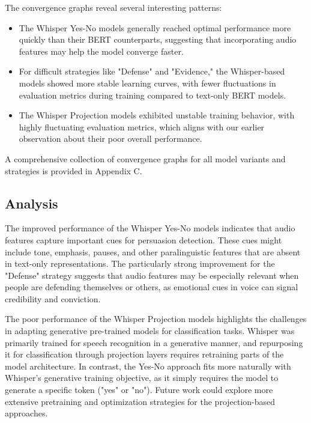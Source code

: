 \documentclass{article}
\begin{document}
The convergence graphs reveal several interesting patterns:

\begin{itemize}
    \item The Whisper Yes-No models generally reached optimal performance more quickly than their BERT counterparts, suggesting that incorporating audio features may help the model converge faster.
    
    \item For difficult strategies like "Defense" and "Evidence," the Whisper-based models showed more stable learning curves, with fewer fluctuations in evaluation metrics during training compared to text-only BERT models.
    
    \item The Whisper Projection models exhibited unstable training behavior, with highly fluctuating evaluation metrics, which aligns with our earlier observation about their poor overall performance.
\end{itemize}

A comprehensive collection of convergence graphs for all model variants and strategies is provided in Appendix C.

\subsection{Analysis}
The improved performance of the Whisper Yes-No models indicates that audio features capture important cues for persuasion detection. These cues might include tone, emphasis, pauses, and other paralinguistic features that are absent in text-only representations. The particularly strong improvement for the "Defense" strategy suggests that audio features may be especially relevant when people are defending themselves or others, as emotional cues in voice can signal credibility and conviction.

The poor performance of the Whisper Projection models highlights the challenges in adapting generative pre-trained models for classification tasks. Whisper was primarily trained for speech recognition in a generative manner, and repurposing it for classification through projection layers requires retraining parts of the model architecture. In contrast, the Yes-No approach fits more naturally with Whisper's generative training objective, as it simply requires the model to generate a specific token ("yes" or "no"). Future work could explore more extensive pretraining and optimization strategies for the projection-based approaches.
\end{document}
